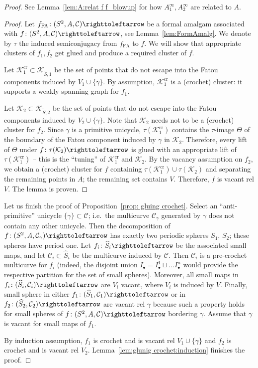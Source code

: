 \documentclass{amsart}
\theoremstyle{plain}
\theoremstyle{definition}
\theoremstyle{remark}
\newcommand{\filled}{{\mathcal K}}
\newcommand{\CC}{{\mathcal C}}
\newcommand\selfmap{\righttoleftarrow}
\begin{document}
\begin{proof}
See Lemma~\ref{lem:A:relat f f_blowup} for how $A^\infty_1,A^\infty_2$ are related to $A$.
\begin{proof}
Let $f_\text{FA}\colon (S^2,A,\CC)\selfmap$ be a formal amalgam associated with $f\colon (S^2,A,\CC)\selfmap$, see Lemma~\ref{lem:FormAmalg}. We denote by $\tau$ the induced semiconjugacy from $f_\text{FA}$ to $f$. We will show that appropriate clusters of $f_1,f_2$ get glued and produce a required cluster of $f$.

Let $\filled^\text{cr}_1 \subset \filled_{\widetilde S,1}$ be the set of points that do not escape into the Fatou components induced by $V_1\cup \{\gamma\}$. By assumption, $\filled^\text{cr}_1$ is a (crochet) cluster: it supports a weakly spanning graph for $f_1$.

Let $\filled_2 \subset \filled_{\widetilde S,2}$ be the set of points that do not escape into the Fatou components induced by $V_2\cup \{\gamma\}$. Note that $\filled_2$ needs not to be a (crochet) cluster for $f_2$. Since $\gamma$ is a primitive unicycle, $\tau(\filled^\text{cr}_1)$ contains the $\tau$-image $\Theta$ of the boundary of the Fatou component induced by $\gamma$ in $\filled_{2}$. Therefore, every lift of $\Theta$ under $f\colon \tau(\filled_2)\selfmap$ is glued with an appropriate lift of $\tau(\filled^\text{cr}_1)$ -- this is the ``tuning'' of $\filled^\text{cr}_1$ and $\filled_2$. By the vacancy assumption on $f_2$, we obtain a (crochet) cluster for $f$ containing $\tau(\filled^\text{cr}_1)\cup \tau(\filled_2)$ and separating the remaining points in $A$; the remaining set contains $V$. Therefore, $f$ is vacant rel $V$. The lemma is proven.
\end{proof}



Let us finish the proof of Proposition~\ref{prop: gluing crochet}. Select an ``anti-primitive'' unicycle $\{\gamma\}\subset \CC$; i.e.~the multicurve $\CC_\gamma$ generated by $\gamma$ does not contain any other unicycle. Then the decomposition of $f\colon (S^2,A,\CC_\gamma)\selfmap$ has exactly two periodic spheres $S_1$, $S_2$; these spheres have period one. Let $f_i\colon \widehat S_i\selfmap$ be the associated small maps, and let $\CC_i\subset \widehat S_i$ be the multicurve induced by $\CC$. Then $\CC_i$ is a pre-crochet multicurve for $f_i$ (indeed, the disjoint union $I_\bullet=I_\bullet^1\sqcup\dots I^{n}_\bullet$ would provide the respective partition for the set of small spheres). Moreover, all small maps in $f_i\colon (\widehat S_i, \CC_i)\selfmap$ are $V_i$ vacant, where $V_i$ is induced by $V$. Finally, small sphere in either $f_1\colon (\widehat S_1, \CC_1)\selfmap$ or in $f_2\colon (\widehat S_2, \CC_2)\selfmap$ are vacant rel $\gamma$ because such a property holds for small spheres of $f\colon (S^2,A,\CC)\selfmap$ bordering $\gamma$. Assume that $\gamma$ is vacant for small maps of $f_1$. 

By induction assumption, $f_1$ is crochet and is vacant rel $V_1\cup \{\gamma\}$ and $f_2$ is crochet and is vacant rel $V_2$. Lemma~\ref{lem:glunig crochet:induction} finishes the proof.
\end{proof}
 
\end{document}
